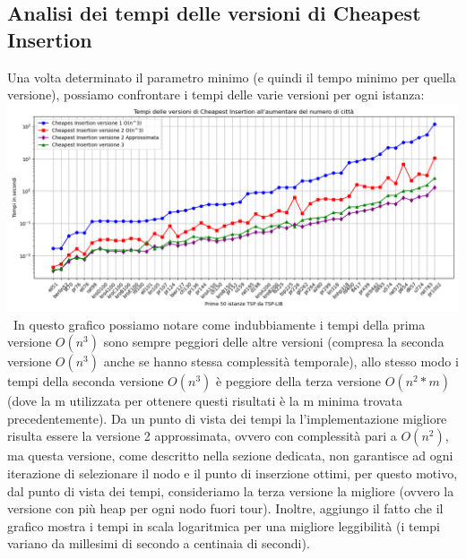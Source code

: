 \documentclass[a4paper,12pt]{report}
\begin{document}
\subsection{Analisi dei tempi delle versioni di Cheapest Insertion}
Una volta determinato il parametro minimo (e quindi il tempo minimo per quella versione), possiamo confrontare i tempi delle varie versioni per ogni istanza: \newline
\includegraphics[width=1\textwidth]{../Grafici/2.png} \
In questo grafico possiamo notare come indubbiamente i tempi della prima versione $O(n^3)$ sono sempre peggiori delle altre versioni (compresa la seconda versione $O(n^3)$ anche se hanno stessa complessità temporale), allo stesso modo i tempi della seconda versione $O(n^3)$ è peggiore della terza versione $O(n^2 * m)$ (dove la m utilizzata per ottenere questi risultati è la m minima trovata precedentemente). Da un punto di vista dei tempi la l'implementazione migliore risulta essere la versione 2 approssimata, ovvero con complessità pari a $O(n^2)$, ma questa versione, come descritto nella sezione dedicata, non garantisce ad ogni iterazione di selezionare il nodo e il punto di inserzione ottimi, per questo motivo, dal punto di vista dei tempi, consideriamo la terza versione la migliore (ovvero la versione con più heap per ogni nodo fuori tour). Inoltre, aggiungo il fatto che il grafico mostra i tempi in scala logaritmica per una migliore leggibilità (i tempi variano da millesimi di secondo a centinaia di secondi).
\end{document}
